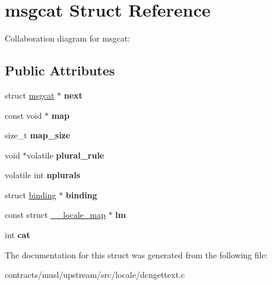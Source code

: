 \hypertarget{structmsgcat}{}\section{msgcat Struct Reference}
\label{structmsgcat}


Collaboration diagram for msgcat\+:
\subsection*{Public Attributes}
\begin{DoxyCompactItemize}
\item 
\mbox{\label{structmsgcat_a0779cf044ce81c6bbc41727f25210842}} 
struct \mbox{\hyperlink{structmsgcat}{msgcat}} $\ast$ {\bfseries next}
\item 
\mbox{\label{structmsgcat_a2903917beef562352845f50dec8897a9}} 
const void $\ast$ {\bfseries map}
\item 
\mbox{\label{structmsgcat_a5451fcdfcf1c175f8e10765a6b4cf5d7}} 
size\+\_\+t {\bfseries map\+\_\+size}
\item 
\mbox{\label{structmsgcat_a3fca1309e8449048cf0681318846909a}} 
void $\ast$volatile {\bfseries plural\+\_\+rule}
\item 
\mbox{\label{structmsgcat_aa598839dc4a1fbc0b4d5d617c1cd2cc2}} 
volatile int {\bfseries nplurals}
\item 
\mbox{\label{structmsgcat_a4059d5c5ad8d3745b1238f3a6e4e04da}} 
struct \mbox{\hyperlink{structbinding}{binding}} $\ast$ {\bfseries binding}
\item 
\mbox{\label{structmsgcat_afe68493219fe9ddcfb1f5fb4197d6588}} 
const struct \mbox{\hyperlink{struct____locale__map}{\+\_\+\+\_\+locale\+\_\+map}} $\ast$ {\bfseries lm}
\item 
\mbox{\label{structmsgcat_a2c3baad701243c494aad6f3feaaca2aa}} 
int {\bfseries cat}
\end{DoxyCompactItemize}


The documentation for this struct was generated from the following file\+:\begin{DoxyCompactItemize}
\item 
contracts/musl/upstream/src/locale/dcngettext.\+c\end{DoxyCompactItemize}
